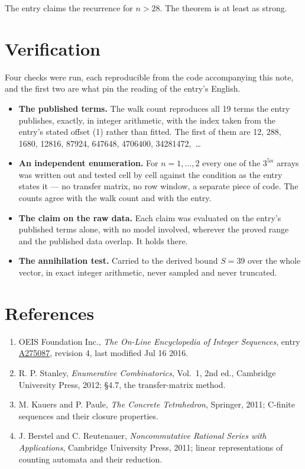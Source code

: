\documentclass[11pt]{article}
\theoremstyle{definition}
\begin{document}
The entry claims the recurrence for $n > 28$. The theorem is at least as strong.

\section{Verification}

Four checks were run, each reproducible from the code accompanying this note, and the first two are what pin the reading of the entry's English.

\begin{itemize}

\item {\bfseries The published terms.} The walk count reproduces all 19 terms the entry publishes, exactly, in integer arithmetic, with the index taken from the entry's stated offset (1) rather than fitted. The first of them are 12, 288, 1680, 12816, 87924, 647648, 4706400, 34281472,~\dots

\item {\bfseries An independent enumeration.} For $n = 1,\dots,2$ every one of the $3^{5n}$ arrays was written out and tested cell by cell against the condition as the entry states it --- no transfer matrix, no row window, a separate piece of code. The counts agree with the walk count and with the entry.

\item {\bfseries The claim on the raw data.} Each claim was evaluated on the entry's published terms alone, with no model involved, wherever the proved range and the published data overlap. It holds there.

\item {\bfseries The annihilation test.} Carried to the derived bound $S = 39$ over the whole vector, in exact integer arithmetic, never sampled and never truncated.

\end{itemize}

\section{References}

\begin{enumerate}

\item OEIS Foundation Inc., \emph{The On-Line Encyclopedia of Integer Sequences}, entry \href{https://oeis.org/A275087}{A275087}, revision 4, last modified Jul 16 2016.

\item R. P. Stanley, \emph{Enumerative Combinatorics}, Vol.~1, 2nd ed., Cambridge University Press, 2012; \S4.7, the transfer-matrix method.

\item M. Kauers and P. Paule, \emph{The Concrete Tetrahedron}, Springer, 2011; C-finite sequences and their closure properties.

\item J. Berstel and C. Reutenauer, \emph{Noncommutative Rational Series with Applications}, Cambridge University Press, 2011; linear representations of counting automata and their reduction.

\end{enumerate}
\end{document}
